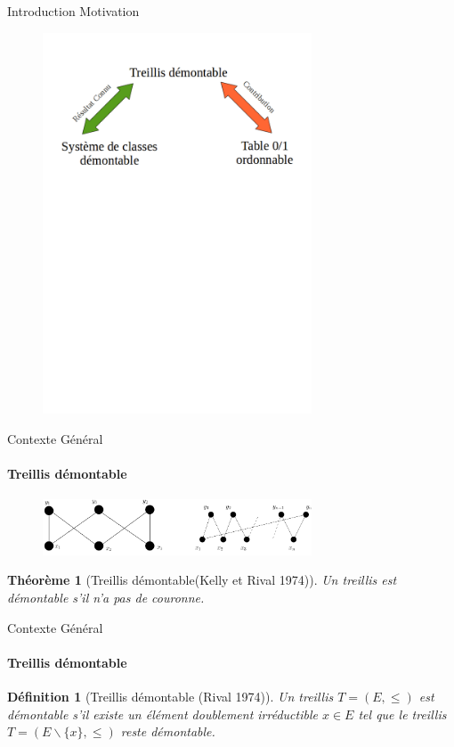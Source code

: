\documentclass{beamer}
\newtheorem{de}{Définition}
\newtheorem{theo}{Théorème}
\begin{document}
  \begin{frame}{Introduction}
  \LARGE {\textrm{Motivation}}
   \begin{figure}
	\includegraphics[width=8cm]{images/memoire_figure6.png} 
    \end{figure}
  \end{frame}
  \begin{frame}{Contexte Général}
  \framesubtitle{Treillis démontable}
   \begin{figure}
	\includegraphics[width=8cm]{images/3c.png} 
    \end{figure}

	\begin{theo}[Treillis démontable(Kelly et Rival 1974)]
	Un treillis est démontable s'il n'a pas de couronne.
	\end{theo}
  \end{frame}

  \begin{frame}{Contexte Général}
  \framesubtitle{Treillis démontable}
	\begin{de}[Treillis démontable (Rival 1974)]
	Un treillis $T = (E, \leq)$ est démontable s'il existe un élément doublement irréductible $x \in E$ tel que 
	le treillis $T = (E \backslash \{x\}, \leq)$ reste démontable.
	\end{de}
  \end{frame}
\end{document}
